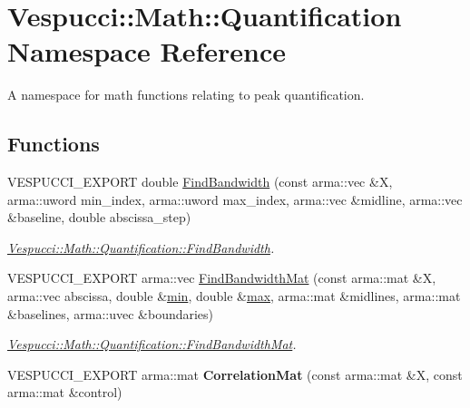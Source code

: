 \hypertarget{namespace_vespucci_1_1_math_1_1_quantification}{}\section{Vespucci\+:\+:Math\+:\+:Quantification Namespace Reference}
\label{namespace_vespucci_1_1_math_1_1_quantification}


A namespace for math functions relating to peak quantification.  


\subsection*{Functions}
\begin{DoxyCompactItemize}
\item 
V\+E\+S\+P\+U\+C\+C\+I\+\_\+\+E\+X\+P\+O\+RT double \hyperlink{namespace_vespucci_1_1_math_1_1_quantification_a9ae95323be0190407aac32ec87605352}{Find\+Bandwidth} (const arma\+::vec \&X, arma\+::uword min\+\_\+index, arma\+::uword max\+\_\+index, arma\+::vec \&midline, arma\+::vec \&baseline, double abscissa\+\_\+step)
\begin{DoxyCompactList}\small\item\em \hyperlink{namespace_vespucci_1_1_math_1_1_quantification_a9ae95323be0190407aac32ec87605352}{Vespucci\+::\+Math\+::\+Quantification\+::\+Find\+Bandwidth}. \end{DoxyCompactList}\item 
V\+E\+S\+P\+U\+C\+C\+I\+\_\+\+E\+X\+P\+O\+RT arma\+::vec \hyperlink{namespace_vespucci_1_1_math_1_1_quantification_a1f48a5ba0518572ef75a81985a267265}{Find\+Bandwidth\+Mat} (const arma\+::mat \&X, arma\+::vec abscissa, double \&\hyperlink{namespace_vespucci_1_1_math_a884dc00603c6aed8e2ee23988c429c64}{min}, double \&\hyperlink{namespace_vespucci_1_1_math_a3d8f536b4465a4bacce89a51e3854daf}{max}, arma\+::mat \&midlines, arma\+::mat \&baselines, arma\+::uvec \&boundaries)
\begin{DoxyCompactList}\small\item\em \hyperlink{namespace_vespucci_1_1_math_1_1_quantification_a1f48a5ba0518572ef75a81985a267265}{Vespucci\+::\+Math\+::\+Quantification\+::\+Find\+Bandwidth\+Mat}. \end{DoxyCompactList}\item 
V\+E\+S\+P\+U\+C\+C\+I\+\_\+\+E\+X\+P\+O\+RT arma\+::mat {\bfseries Correlation\+Mat} (const arma\+::mat \&X, const arma\+::mat \&control)\hypertarget{namespace_vespucci_1_1_math_1_1_quantification_ad85109aa673965dbc5b9898d871810f7}{}\label{namespace_vespucci_1_1_math_1_1_quantification_ad85109aa673965dbc5b9898d871810f7}


\end{DoxyCompactItemize}
